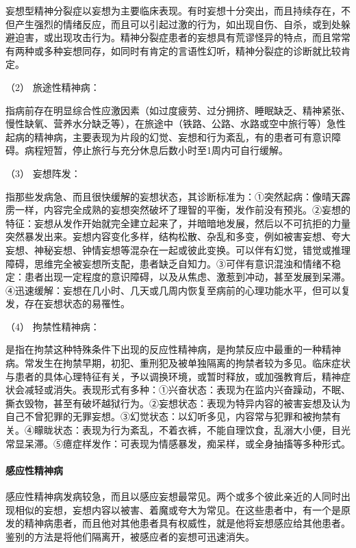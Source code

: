 妄想型精神分裂症以妄想为主要临床表现。有时妄想十分突出，而且持续存在，不但产生强烈的情绪反应，而且可以引起过激的行为，如出现自伤、自杀，或到处躲避迫害，或出现攻击行为。精神分裂症患者的妄想具有荒谬怪异的特点，而且常常有两种或多种妄想同存，如同时有肯定的言语性幻听，精神分裂症的诊断就比较肯定。

\hypertarget{text00049.htmlux5cux23CHP1-18-7-2-1-2}{}
（2） 旅途性精神病：

指病前存在明显综合性应激因素（如过度疲劳、过分拥挤、睡眠缺乏、精神紧张、慢性缺氧、营养水分缺乏等），在旅途中（铁路、公路、水路或空中旅行等）急性起病的精神病，主要表现为片段的幻觉、妄想和行为紊乱，有的患者可有意识障碍。病程短暂，停止旅行与充分休息后数小时至1周内可自行缓解。

\hypertarget{text00049.htmlux5cux23CHP1-18-7-2-1-3}{}
（3） 妄想阵发：

指那些发病急、而且很快缓解的妄想状态，其诊断标准为：①突然起病：像晴天霹雳一样，内容完全成熟的妄想突然破坏了理智的平衡，发作前没有预兆。②妄想的特征：妄想从发作开始就完全建立起来了，并暗暗地发展，然后以不可抗拒的力量突然暴发出来。妄想内容变化多样，结构松散、杂乱和多变，例如被害妄想、夸大妄想、神秘妄想、钟情妄想等混杂在一起或彼此变换。可以伴有幻觉，错觉或推理障碍，思维完全被妄想所支配，患者缺乏自知力。③可伴有意识混浊和情绪不稳定：患者出现一定程度的意识障碍，以及从焦虑、激惹到冲动，甚至发展到呆滞。④迅速缓解：妄想在几小时、几天或几周内恢复至病前的心理功能水平，但可以复发，存在妄想状态的易罹性。

\hypertarget{text00049.htmlux5cux23CHP1-18-7-2-1-4}{}
（4） 拘禁性精神病：

是指在拘禁这种特殊条件下出现的反应性精神病，是拘禁反应中最重的一种精神病。常发生在拘禁早期，初犯、重刑犯及被单独隔离的拘禁者较为多见。临床症状与患者的具体心理特征有关，予以调换环境，或暂时释放，或加强教育后，精神症状会减轻或消失。表现形式有多种：①兴奋状态：表现为在监内兴奋躁动，不眠、撕衣毁物，甚至有破坏越狱行为。②妄想状态：表现为特异内容的被害妄想及认为自己不曾犯罪的无罪妄想。③幻觉状态：以幻听多见，内容常与犯罪和被拘禁有关。④矇眬状态：表现为行为紊乱，不着衣裤，不能自理饮食，乱溺大小便，目光常显呆滞。⑤癔症样发作：可表现为情感暴发，痴呆样，或全身抽搐等多种形式。

\paragraph{感应性精神病}

感应性精神病发病较急，而且以感应妄想最常见。两个或多个彼此亲近的人同时出现相似的妄想，妄想内容以被害、着魔或夸大为常见。在这些患者中，有一个是原发的精神病患者，而且他对其他患者具有权威性，就是他将妄想感应给其他患者。鉴别的方法是将他们隔离开，被感应者的妄想可迅速消失。

